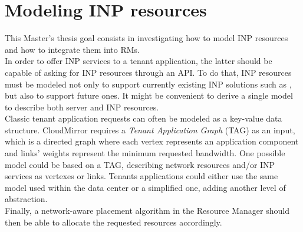 \documentclass[letterpaper,twocolumn,10pt]{article}
\begin{document}
\section{Modeling INP resources}
This Master's thesis goal consists in investigating how to model INP resources and how to integrate them into RMs.\\
In order to offer INP services to a tenant application, the latter should be capable of asking for INP resources through an API. To do that, INP resources must be modeled not only to support currently existing INP solutions such as \cite{daiet} \cite{netchain} \cite{incbricks} \cite{sharp}, but also to support future ones. It might be convenient to derive a single model to describe both server and INP resources.\\
Classic tenant application requests can often be modeled as a key-value data structure. CloudMirror \cite{cloudmirror} requires a \textit{Tenant Application Graph} (TAG) as an input, which is a directed graph where each vertex represents an application component and links' weights represent the minimum requested bandwidth. One possible model could be based on a TAG, describing network resources and/or INP services as vertexes or links. Tenants applications could either use the same model used within the data center or a simplified one, adding another level of abstraction.\\
Finally, a network-aware placement algorithm in the Resource Manager should then be able to allocate the requested resources accordingly.



\end{document}
